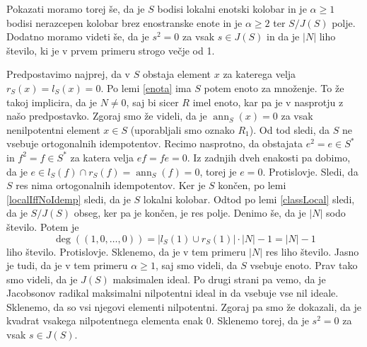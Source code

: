 \documentclass[a4paper, 12pt]{amsart}
\theoremstyle{definition} %
\theoremstyle{plain} %
\DeclareMathOperator{\ann}{ann}
\begin{document}
Pokazati moramo torej še, da je $S$ bodisi lokalni enotski kolobar in je $\alpha \ge 1$ bodisi nerazcepen kolobar brez enostranske enote in je $\alpha \ge 2$ ter $S/J(S)$ polje. Dodatno moramo videti še, da je $s^2 = 0$ za vsak $s\in J(S)$ in da je $|N|$ liho število, ki je v prvem primeru strogo večje od 1. 

Predpostavimo najprej, da v $S$ obstaja element $x$ za katerega velja $r_S(x) = l_S(x) = 0$. Po lemi \ref{enota} ima $S$ potem enoto za množenje. To že takoj implicira, da je $N\neq 0$, saj bi sicer $R$ imel enoto, kar pa je v nasprotju z našo predpostavko. Zgoraj smo že videli, da je $\ann_S(x) = 0$ za vsak nenilpotentni element $x\in S$ (uporabljali smo oznako $R_1$). Od tod sledi, da $S$ ne vsebuje ortogonalnih idempotentov. Recimo nasprotno, da obstajata $e^2 = e\in S^*$ in $f^2 = f\in S^*$ za katera velja $ef = fe=0$. Iz zadnjih dveh enakosti pa dobimo, da je $e\in l_S(f) \cap r_S(f) =\ann_S(f) = 0$, torej je $e=0$. Protislovje. Sledi, da $S$ res nima ortogonalnih idempotentov. Ker je $S$ končen, po lemi \ref{localIffNoIdemp} sledi, da je $S$ lokalni kolobar. Odtod po lemi \ref{classLocal} sledi, da je $S/J(S)$ obseg, ker pa je končen, je res polje. Denimo še, da je $|N|$ sodo število. Potem je 
$$
\deg((1,0,\dots,0)) = |l_S(1)\cup r_S(1)|\cdot |N| - 1 = |N| - 1
$$
liho število. Protislovje. Sklenemo, da je v tem primeru $|N|$ res liho število. Jasno je tudi, da je v tem primeru $\alpha \ge 1$, saj smo videli, da $S$ vsebuje enoto. Prav tako smo videli, da je $J(S)$ maksimalen ideal. Po drugi strani pa vemo, da je Jacobsonov radikal maksimalni nilpotentni ideal in da vsebuje vse nil ideale. Sklenemo, da so vsi njegovi elementi nilpotentni. Zgoraj pa smo že dokazali, da je kvadrat vsakega nilpotentnega elementa enak 0. Sklenemo torej, da je $s^2 = 0$ za vsak $s\in J(S)$.
\end{document}
